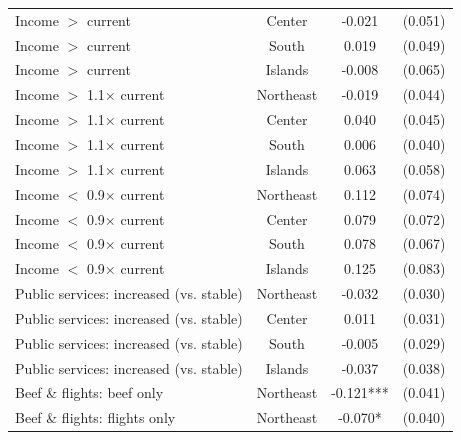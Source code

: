 \begin{table}[H]
\begin{tabular}{ l c c c }
\hspace{0.05cm} Income $>$ current & Center & -0.021 & (0.051) \\
\hspace{0.05cm} Income $>$ current & South & 0.019 & (0.049) \\
\hspace{0.05cm} Income $>$ current & Islands & -0.008 & (0.065) \\
\hspace{0.05cm} Income $>$ 1.1$\times$ current & Northeast & -0.019 & (0.044) \\
\hspace{0.05cm} Income $>$ 1.1$\times$ current & Center & 0.040 & (0.045) \\
\hspace{0.05cm} Income $>$ 1.1$\times$ current & South & 0.006 & (0.040) \\
\hspace{0.05cm} Income $>$ 1.1$\times$ current & Islands & 0.063 & (0.058) \\
\hspace{0.05cm} Income $<$ 0.9$\times$ current & Northeast & 0.112 & (0.074) \\
\hspace{0.05cm} Income $<$ 0.9$\times$ current & Center & 0.079 & (0.072) \\
\hspace{0.05cm} Income $<$ 0.9$\times$ current & South & 0.078 & (0.067) \\
\hspace{0.05cm} Income $<$ 0.9$\times$ current & Islands & 0.125 & (0.083) \\
\hspace{0.05cm} Public services: increased (vs. stable) & Northeast & -0.032 & (0.030) \\
\hspace{0.05cm} Public services: increased (vs. stable) & Center & 0.011 & (0.031) \\
\hspace{0.05cm} Public services: increased (vs. stable) & South & -0.005 & (0.029) \\
\hspace{0.05cm} Public services: increased (vs. stable) & Islands & -0.037 & (0.038) \\
\hspace{0.05cm} Beef \& flights: beef only & Northeast & -0.121*** & (0.041) \\
\hspace{0.05cm} Beef \& flights: flights only & Northeast & -0.070* & (0.040) \\

\end{tabular}
\end{table}
